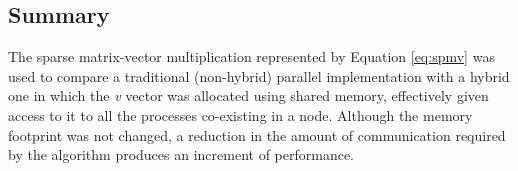 \subsection*{Summary}

The sparse matrix-vector multiplication represented by Equation \ref{eq:spmv} was used to compare a traditional (non-hybrid) parallel implementation with a hybrid one in which the \emph{v} vector was allocated using shared memory, effectively given access to it to all the processes co-existing in a node. Although the memory footprint was not changed, a reduction in the amount of communication required by the algorithm produces an increment of performance.


